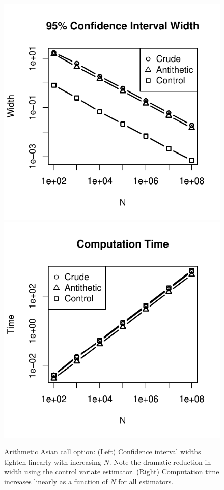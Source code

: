 \documentclass[12pt]{article}
\begin{document}
\begin{figure}[H]
	\centering
 	\includegraphics[scale=0.75]{../plots/q3/ari_asian_call_CI_widths.pdf}
	\includegraphics[scale=0.75]{../plots/q3/ari_asian_call_time.pdf}
\caption{Arithmetic Asian call option: (Left) Confidence interval widths tighten linearly with increasing $N$. Note the dramatic reduction in width using the control variate estimator. (Right) Computation time increases linearly as a function of $N$ for all estimators.}
\label{fig:ari_asian_call_CI_time}
\end{figure}
\end{document}
